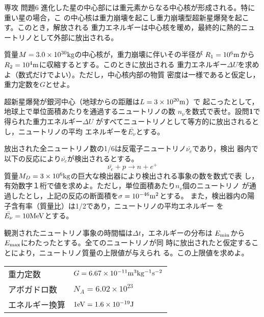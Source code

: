\documentclass[fleqn]{jbook}
\begin{document}
\begin{question}{専攻 問題6}{}
進化した星の中心部には重元素からなる中心核が形成される。特に重い星の場合，こ
の中心核は重力崩壊を起こし重力崩壊型超新星爆発を起こす。このとき，解放される
重力エネルギーは中心核を暖め，最終的に熱的ニュートリノとして外部に放出される。

\begin{subquestions}
\SubQuestion
質量$M=3.0\times10^{30}{\rm kg}$の中心核が，重力崩壊に伴いその半径が
$R_1=10^6{\rm m}$から$R_2=10^4{\rm m}$に収縮するとする。このときに放出される
重力エネルギー$\Delta U$を求めよ（数式だけでよい）。ただし，中心核内部の物質
密度は一様であると仮定し，重力定数を$G$とせよ。

\SubQuestion

  超新星爆発が銀河中心（地球からの距離は$L=3\times10^{20}{\rm m}$）で
 起こったとして，地球上で単位面積あたりを通過するニュートリノの数
 $n_{\nu}$を数式で表せ。設問{\bf{1}}で得られた重力エネルギー$\Delta U$
 がすべてニュートリノとして等方的に放出されるとし，ニュートリノの平均
 エネルギーを$\bar{E_{\nu}}$とする。

\SubQuestion
放出された全ニュートリノ数の1/6は反電子ニュートリノ$\bar{\nu_e}$であり，検出
器内で以下の反応により$\bar{\nu_e}$が検出されるとする。
\[\bar{\nu_e}+p\rightarrow n+e^+ \]
質量$M_D=3\times10^6{\rm kg}$の巨大な検出器により検出される事象の数を数式で表
し，有効数字１桁で値を求めよ。ただし，単位面積あたり$n_{\nu}$個のニュートリノ
が通過したとし，上記の反応の断面積を$\sigma=10^{-46}{\rm m^2}$とする。
また，検出器内の陽子含有率（質量比）は1/2であり，ニュートリノの平均エネルギー
を$\bar{E_{\nu}}=10{\rm MeV}$とする。

\SubQuestion

観測されたニュートリノ事象の時間幅は$\Delta t$，エネルギーの分布は
$E_{\rm min}$から$E_{\rm max}$にわたったとする。全てのニュートリノが同
時に放出されたと仮定することにより，ニュートリノ質量の上限値が与えられ
る。この上限値を求めよ。

\begin{center}
\begin{tabular}{ll}
\hline
重力定数 & $G=6.67\times10^{-11}{\rm m^3kg^{-1}s^{-2}}$\\
アボガドロ数 & $N_A=6.02\times10^{23}$ \\
エネルギー換算 &$ 1{\rm eV}=1.6\times10^{-19}{\rm J} $\\ \hline
\end{tabular}
\end{center}

\end{subquestions}
\end{question}
\end{document}
